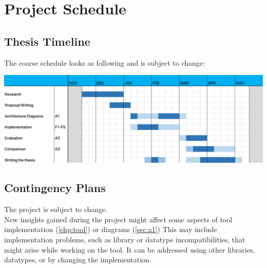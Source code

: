 \chapter{Project Schedule}
\label{chp:schedule}

\section{Thesis Timeline}
\label{sec:gantt}

The coarse schedule looks as following and is subject to change:

\includegraphics[width=\textwidth]{Graphics/time.PNG}

\section{Contingency Plans}
\label{sec:contingency}

The project is subject to change.\\
New insights gained during the project might affect some aspects of tool implementation (\ref{chp:tool}) or diagrams (\ref{sec:a1})
This may include implementation problems, such as library or datatype incompatibilities, that might arise while working on the tool. 
It can be addressed using other libraries, datatypes, or by changing the implementation. 